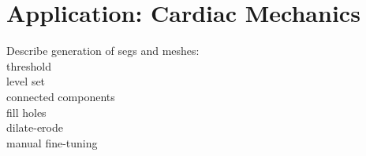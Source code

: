 \chapter{Application: Cardiac Mechanics}
%

Describe generation of segs and meshes: \\
threshold \\
level set \\
connected components \\
fill holes \\
dilate-erode \\
manual fine-tuning \\

\begin{figure}[ht]
\centering
{}
\end{figure}

